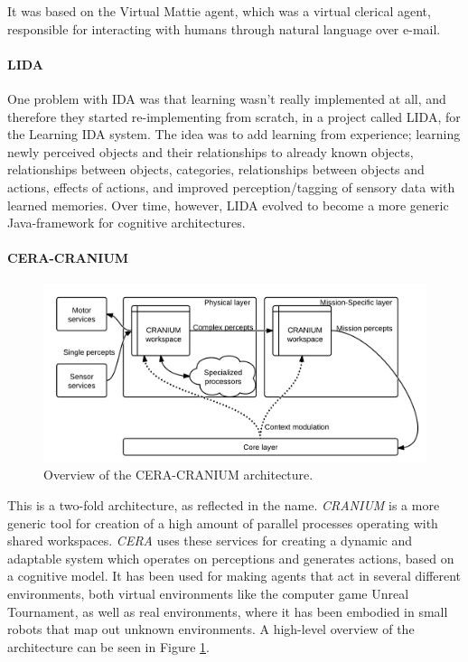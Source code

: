 It was based on the Virtual Mattie agent, which was a virtual clerical agent, responsible for interacting with humans through natural language over e-mail.\cite{franklin1996virtual}

\paragraph{LIDA}
One problem with IDA was that learning wasn't really implemented at all, and therefore they started re-implementing from scratch, in a project called LIDA, for the Learning IDA system. The idea was to add learning from experience; learning newly perceived objects and their relationships to already known objects, relationships between objects, categories, relationships between objects and actions, effects of actions, and improved perception/tagging of sensory data with learned memories.\cite{franklin2006lida} Over time, however, LIDA evolved to become a more generic Java-framework for cognitive architectures.\cite{snaider2011lida}

\paragraph{CERA-CRANIUM}
\begin{figure}[h!tb]
\centering
\includegraphics[width=\textwidth]{graphics/ceracranium.png}
\caption{Overview of the CERA-CRANIUM architecture.}
\label{fig:cera-cranium}
\end{figure}
This is a two-fold architecture, as reflected in the name. {\em CRANIUM} is a more generic tool for creation of a high amount of parallel processes operating with shared workspaces. {\em CERA} uses these services for creating a dynamic and adaptable system which operates on perceptions and generates actions, based on a cognitive model.\cite{arrabales2009gamechars} It has been used for making agents that act in several different environments, both virtual environments like the computer game Unreal Tournament, as well as real environments, where it has been embodied in small robots that map out unknown environments. \cite{arrabales2009ceracranium} A high-level overview of the architecture can be seen in Figure \ref{fig:cera-cranium}.

